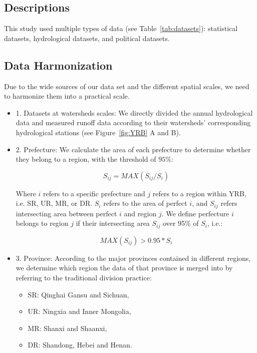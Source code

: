 \subsection*{Descriptions}
This study used multiple types of data (see Table~\ref{tab:datasets}): statistical datasets, hydrological datasets, and political datasets.

\subsection*{Data Harmonization}
Due to the wide sources of our data set and the different spatial scales, we need to harmonize them into a practical scale.
\begin{itemize}
    \item 1. Datasets at watersheds scales:
        We directly divided the annual hydrological data and measured runoff data according to their watersheds' corresponding hydrological stations (see Figure~\ref{fig:YRB} A and B).
    \item 2. Prefecture:
        We calculate the area of each prefecture to determine whether they belong to a region, with the threshold of $95\%$:

        \begin{equation}
            S_{ij} = MAX(S_{ij} / S_i)
        \end{equation}

        Where $i$ refers to a specific prefecture and $j$ refers to a region within YRB, i.e. SR, UR, MR, or DR. $S_i$ refers to the area of perfect $i$, and $S_{ij}$ refers intersecting area between perfect $i$ and region $j$.
        We define perfecture $i$ belongs to region $j$ if their intersecting area $S_{ij}$ over 95\% of $S_i$, i.e.:

        \begin{equation}
            MAX(S_{ij}) > 0.95 * S_i
        \end{equation}
    \item 3. Province:
        According to the major provinces contained in different regions, we determine which region the data of that province is merged into by referring to the traditional division practice:
    \begin{itemize}
        \item SR: Qinghai Gansu and Sichuan,
        \item UR: Ningxia and Inner Mongolia,
        \item MR: Shanxi and Shaanxi,
        \item DR: Shandong, Hebei and Henan.
    \end{itemize}
\end{itemize}

